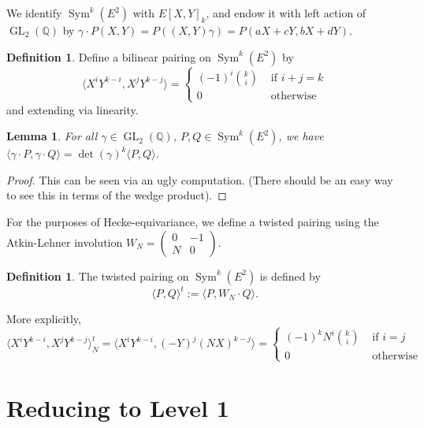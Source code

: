 \documentclass[10pt]{amsart}
\theoremstyle{plain}
\newtheorem{lemma}[theorem]{Lemma}
\theoremstyle{definition}
\newtheorem{definition}[theorem]{Definition}
\newcommand{\QQ}{{\mathbb{Q}}}
\DeclareMathOperator{\GL}{GL}
\DeclareMathOperator{\Sym}{Sym}
\begin{document}
We identify $\Sym^k(E^2)$ with $E[X,Y]_k$, and endow it with left action of $\GL_2(\QQ)$ by $\gamma \cdot P(X,Y) = P((X,Y)\gamma)=P(aX+cY,bX+dY).$ 
\begin{definition}
Define a bilinear pairing on $\Sym^k(E^2)$ by
\begin{equation*}
	\langle X^iY^{k-i}, X^j Y^{k-j} \rangle = \begin{cases} (-1)^i {k \choose i} & \text{ if } i+j=k\\
												0	& \text{ otherwise} \end{cases}
\end{equation*}
and extending via linearity.
\end{definition}


\begin{lemma}
For all $\gamma\in \GL_2(\QQ)$, $P,Q\in\Sym^k(E^2)$, we have $\langle \gamma\cdot P,\gamma \cdot Q\rangle = \det(\gamma)^k \langle P,Q\rangle$.
\end{lemma}
\begin{proof}
This can be seen via an ugly computation. (There should be an easy way to see this in terms of the wedge product).
\end{proof}

For the purposes of Hecke-equivariance, we define a twisted pairing using the Atkin-Lehner involution $W_N = \begin{pmatrix} 0 & -1 \\ N & 0 \end{pmatrix}$.
\begin{definition}
The twisted pairing on $\Sym^k(E^2)$ is defined by
\begin{equation}
	\langle P, Q\rangle^t := \langle P, W_N \cdot Q\rangle.
\end{equation}
\end{definition}
More explicitly,
\begin{equation*}
	\langle X^iY^{k-i}, X^j Y^{k-j} \rangle_N^t = \langle X^i Y^{k-i}, (-Y)^j(NX)^{k-j}\rangle= \begin{cases} (-1)^k N^i {k \choose i} & \text{ if } i=j\\
												0	& \text{ otherwise} \end{cases}
\end{equation*}

\section{Reducing to Level 1} \label{sec:level_one}
\end{document}
